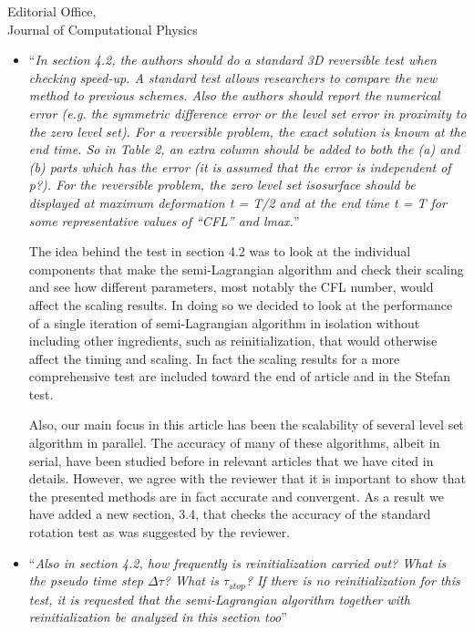 \documentclass{scrlttr2}
\begin{document}
\begin{letter} {Editorial Office, \\ Journal of Computational
Physics}
\begin{itemize}
\begin{itemize}
Our method for interpolation only requires that the values of the function (and
optionally its second derivatives if using multi-quadratic interpolation) be
defined on all vertices of cell \texttt{c}. This, in turn is guarantied by the
fact that the boundary of each process is covered by a layer of ghost cells that
have updated the ghost values at all their vertices before performing the
interpolation. As a result, all the vertices of cell \texttt{c}, whether local
or ghost, have valid values that can be used for interpolation.
\\
\item ``\textit{In section 4.2, the authors should do a standard 3D reversible
  test when checking speed-up. A standard test allows researchers to compare
the new method to previous schemes. Also the authors should report the
numerical error (e.g. the symmetric difference error or the level set error in
proximity to the zero level set). For a reversible problem, the exact solution
is known at the end time. So in Table 2, an extra column should be added to
both the (a) and (b) parts which has the error (it is assumed that the error is
independent of p?). For the reversible problem, the zero level set isosurface
should be displayed at maximum deformation t = T/2 and at the end time t = T
for some representative values of “CFL” and lmax.}''

The idea behind the test in section 4.2 was to look at the individual
components that make the semi-Lagrangian algorithm and check their scaling and
see how different parameters, most notably the CFL number, would affect the
scaling results. In doing so we decided to look at the performance of a single
iteration of semi-Lagrangian algorithm in isolation without including other
ingredients, such as reinitialization, that would otherwise affect the timing
and scaling. In fact the scaling results for a more comprehensive test are
included toward the end of article and in the Stefan test.

Also, our main focus in this article has been the scalability of several level
set algorithm in parallel. The accuracy of many of these algorithms, albeit in
serial, have been studied before in relevant articles that we have cited in
details. However, we agree with the reviewer that it is important to show that
the presented methods are in fact accurate and convergent. As a result we have
added a new section, 3.4, that checks the accuracy of the standard rotation
test as was suggested by the reviewer.  
\\
\item ``\textit{Also in section 4.2, how frequently is reinitialization carried
  out? What is the pseudo time step $\Delta \tau$? What is $\tau_{stop}$? If
there is no reinitialization for this test, it is requested that the
semi-Lagrangian algorithm together with reinitialization be analyzed in this
section too}''


\end{itemize}
\end{itemize}
\end{letter}
\end{document}
